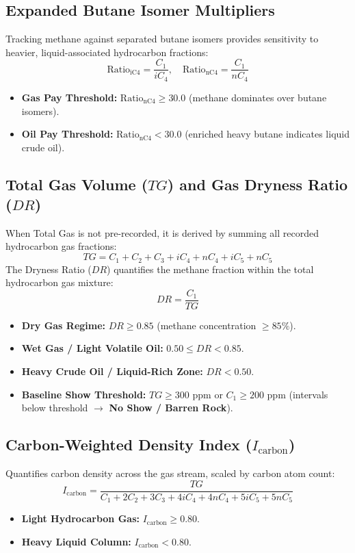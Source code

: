 \subsection{Expanded Butane Isomer Multipliers}
Tracking methane against separated butane isomers provides sensitivity to heavier, liquid-associated hydrocarbon fractions:
\begin{equation}
    \text{Ratio}_{\text{iC4}} = \frac{C_1}{iC_4}, \quad \text{Ratio}_{\text{nC4}} = \frac{C_1}{nC_4}
\end{equation}
\begin{itemize}
    \item \textbf{Gas Pay Threshold:} $\text{Ratio}_{\text{nC4}} \ge 30.0$ (methane dominates over butane isomers).
    \item \textbf{Oil Pay Threshold:} $\text{Ratio}_{\text{nC4}} < 30.0$ (enriched heavy butane indicates liquid crude oil).
\end{itemize}

\subsection{Total Gas Volume ($TG$) and Gas Dryness Ratio ($DR$) \citep{ref14}}
When Total Gas is not pre-recorded, it is derived by summing all recorded hydrocarbon gas fractions:
\begin{equation}
    TG = C_1 + C_2 + C_3 + iC_4 + nC_4 + iC_5 + nC_5
\end{equation}
The Dryness Ratio ($DR$) quantifies the methane fraction within the total hydrocarbon gas mixture:
\begin{equation}
    DR = \frac{C_1}{TG}
\end{equation}
\begin{itemize}
    \item \textbf{Dry Gas Regime:} $DR \ge 0.85$ (methane concentration $\ge 85\%$).
    \item \textbf{Wet Gas / Light Volatile Oil:} $0.50 \le DR < 0.85$.
    \item \textbf{Heavy Crude Oil / Liquid-Rich Zone:} $DR < 0.50$.
    \item \textbf{Baseline Show Threshold:} $TG \ge 300\text{ ppm}$ or $C_1 \ge 200\text{ ppm}$ (intervals below threshold $\rightarrow$ \textbf{No Show / Barren Rock}).
\end{itemize}

\subsection{Carbon-Weighted Density Index ($I_{\text{carbon}}$)}
Quantifies carbon density across the gas stream, scaled by carbon atom count:
\begin{equation}
    I_{\text{carbon}} = \frac{TG}{C_1 + 2C_2 + 3C_3 + 4iC_4 + 4nC_4 + 5iC_5 + 5nC_5}
\end{equation}
\begin{itemize}
    \item \textbf{Light Hydrocarbon Gas:} $I_{\text{carbon}} \ge 0.80$.
    \item \textbf{Heavy Liquid Column:} $I_{\text{carbon}} < 0.80$.
\end{itemize}

